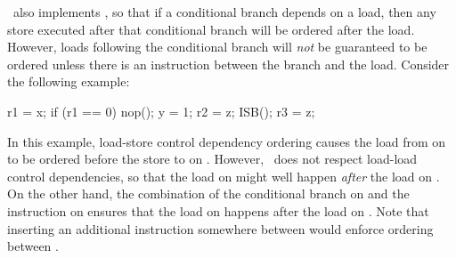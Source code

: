 \ARM\ also implements ,
so that if a conditional
branch depends on a load, then any store executed after that conditional
branch will be ordered after the load.
However, loads following the conditional branch will \emph{not}
be guaranteed to be ordered unless there is an 
instruction between the branch and the load.
Consider the following example:

\begin{fcvlabel}
\begin{VerbatimN}[commandchars=\\\[\]]
r1 = x;			\lnlbl[x]
if (r1 == 0)		\lnlbl[if]
	nop();		\lnlbl[nop]
y = 1;			\lnlbl[y]
r2 = z;			\lnlbl[z1]
ISB();			\lnlbl[isb]
r3 = z;			\lnlbl[z2]
\end{VerbatimN}
\end{fcvlabel}

\begin{fcvref}
In this example, load-store control dependency ordering causes
the load from  on  to be ordered before the store to
 on .
However, \ARM\ does not respect load-load control dependencies, so that
the load on  might well happen \emph{after} the
load on .
On the other hand, the combination of the conditional branch on 
and the  instruction on  ensures that
the load on  happens after the load on .
Note that inserting an additional  instruction somewhere between
 would enforce ordering between .
\end{fcvref}

\subsection{}
\label{sec:memorder:ARMv8}

